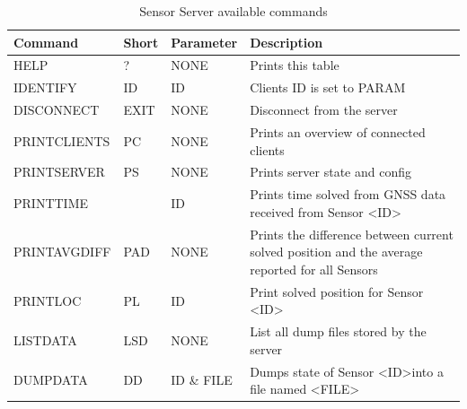 \documentclass[12pt,english,a4paper]{report}
\begin{document}
\begin{table}
	\caption{Sensor Server available commands}
	\label{commands}
	\begin{tabularx}{\textwidth}{|l|l|l|X|}
	  \multicolumn{1}{l}{Command} & \multicolumn{1}{l}{Short} & \multicolumn{1}{l}{Parameter} & \multicolumn{1}{l}{Description}                                                                \\ \hline
	  HELP                        & ?                         & NONE                          & Prints this table                                                                              \\ \hline
	  IDENTIFY                    & ID                        & ID                            & Clients ID is set to PARAM                                                                     \\ \hline
	  DISCONNECT                  & EXIT                      & NONE                          & Disconnect from the server                                                                     \\ \hline
	  PRINTCLIENTS                & PC                        & NONE                          & Prints an overview of connected clients                                                        \\ \hline
	  PRINTSERVER                 & PS                        & NONE                          & Prints server state and config                                                                 \\ \hline
	  PRINTTIME                   &                           & ID                            & Prints time solved from GNSS data received from Sensor \textless ID\textgreater                 \\ \hline
	  PRINTAVGDIFF                & PAD                       & NONE                          & Prints the difference between current solved position and the average reported for all Sensors \\ \hline
	  PRINTLOC                    & PL                        & ID                            & Print solved position for Sensor \textless ID\textgreater                                       \\ \hline
	  LISTDATA                    & LSD                       & NONE                          & List all dump files stored by the server                                                       \\ \hline
	  DUMPDATA                    & DD                        & ID \& FILE                    & Dumps state of Sensor \textless ID\textgreater into a file named \textless FILE\textgreater      \\ \hline

\end{tabularx}
\end{table}
\end{document}
